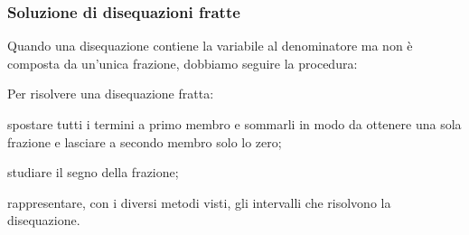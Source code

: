 \subsubsection{Soluzione di disequazioni fratte}

Quando una disequazione contiene la variabile al denominatore ma non è 
composta da un'unica frazione, dobbiamo seguire la procedura:

\begin{procedura}
 Per risolvere una disequazione fratta:
\begin{enumeratea}
 \item spostare tutti i termini a primo membro e sommarli in modo da ottenere 
 una sola frazione e lasciare a secondo membro solo lo zero;
 \item studiare il segno della frazione;
 \item rappresentare, con i diversi metodi visti, 
  gli intervalli che risolvono la disequazione.
\end{enumeratea}
\end{procedura}

